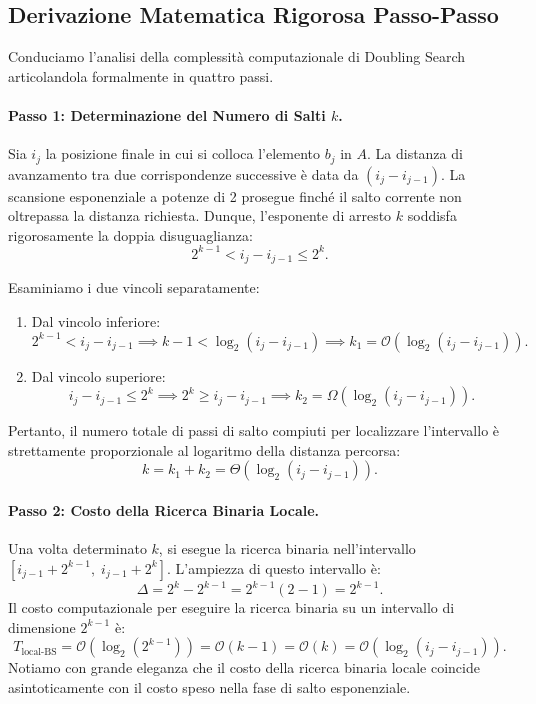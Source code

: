 \FloatBarrier
\subsection{Derivazione Matematica Rigorosa Passo-Passo}
Conduciamo l'analisi della complessità computazionale di Doubling Search articolandola formalmente in quattro passi.

\paragraph{Passo 1: Determinazione del Numero di Salti $k$.}
Sia $i_j$ la posizione finale in cui si colloca l'elemento $b_j$ in $A$. La distanza di avanzamento tra due corrispondenze successive è data da $(i_j - i_{j-1})$.
La scansione esponenziale a potenze di 2 prosegue finché il salto corrente non oltrepassa la distanza richiesta. Dunque, l'esponente di arresto $k$ soddisfa rigorosamente la doppia disuguaglianza:
\begin{equation}
  2^{k-1} < i_j - i_{j-1} \le 2^k.
  \label{eq:doubling-bracket}
\end{equation}

Esaminiamo i due vincoli separatamente:
\begin{enumerate}
  \item Dal vincolo inferiore:
  \begin{equation}
    2^{k-1} < i_j - i_{j-1} \implies k - 1 < \log_2(i_j - i_{j-1}) \implies k_1 = \mathcal{O}(\log_2(i_j - i_{j-1})).
  \end{equation}
  \item Dal vincolo superiore:
  \begin{equation}
    i_j - i_{j-1} \le 2^k \implies 2^k \ge i_j - i_{j-1} \implies k_2 = \Omega(\log_2(i_j - i_{j-1})).
  \end{equation}
\end{enumerate}
Pertanto, il numero totale di passi di salto compiuti per localizzare l'intervallo è strettamente proporzionale al logaritmo della distanza percorsa:
\begin{equation}
  k = k_1 + k_2 = \Theta(\log_2(i_j - i_{j-1})).
\end{equation}

\paragraph{Passo 2: Costo della Ricerca Binaria Locale.}
Una volta determinato $k$, si esegue la ricerca binaria nell'intervallo $[i_{j-1} + 2^{k-1}, \; i_{j-1} + 2^k]$. L'ampiezza di questo intervallo è:
\begin{equation}
  \Delta = 2^k - 2^{k-1} = 2^{k-1} (2 - 1) = 2^{k-1}.
\end{equation}
Il costo computazionale per eseguire la ricerca binaria su un intervallo di dimensione $2^{k-1}$ è:
\begin{equation}
  T_{\text{local-BS}} = \mathcal{O}(\log_2(2^{k-1})) = \mathcal{O}(k - 1) = \mathcal{O}(k) = \mathcal{O}(\log_2(i_j - i_{j-1})).
\end{equation}
Notiamo con grande eleganza che il costo della ricerca binaria locale coincide asintoticamente con il costo speso nella fase di salto esponenziale.

